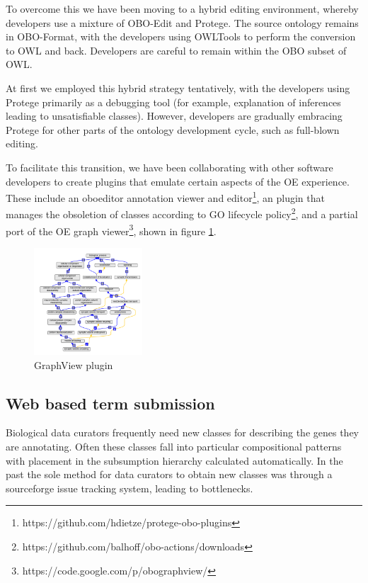 \documentclass{llncs}
\begin{document}
To overcome this we have been moving to a hybrid editing environment,
whereby developers use a mixture of OBO-Edit and Protege. The source
ontology remains in OBO-Format, with the developers using %
OWLTools\cite{OWLTools} to perform the conversion to OWL and
back. Developers are careful to remain within the OBO subset of OWL. %

At first we employed this hybrid strategy tentatively, with the
developers using Protege primarily as a debugging tool (for example,
explanation of inferences leading to unsatisfiable classes). However,
developers are gradually embracing Protege for other parts of the
ontology development cycle, such as full-blown editing.

To facilitate this transition, we have been collaborating with other
software developers to create plugins that emulate certain aspects of
the OE experience. These include an oboeditor annotation viewer and
editor\footnote{https://github.com/hdietze/protege-obo-plugins}, an
plugin that manages the obsoletion of classes according to GO
lifecycle policy\footnote{https://github.com/balhoff/obo-actions/downloads}, and a partial
port of the OE graph
viewer\footnote{https://code.google.com/p/obographview/}, shown in figure
\ref{gv}.

\begin{figure}
\label{gv}
\center
\includegraphics[height=4cm]{gv-plugin}
\caption{GraphView plugin}
\end{figure}

\subsection{Web based term submission}

Biological data curators frequently need new classes for describing
the genes they are annotating. Often these classes fall into
particular compositional patterns with placement in the subsumption
hierarchy calculated automatically. In the past the sole method for
data curators to obtain new classes was through a sourceforge issue
tracking system, leading to bottlenecks.
\end{document}
